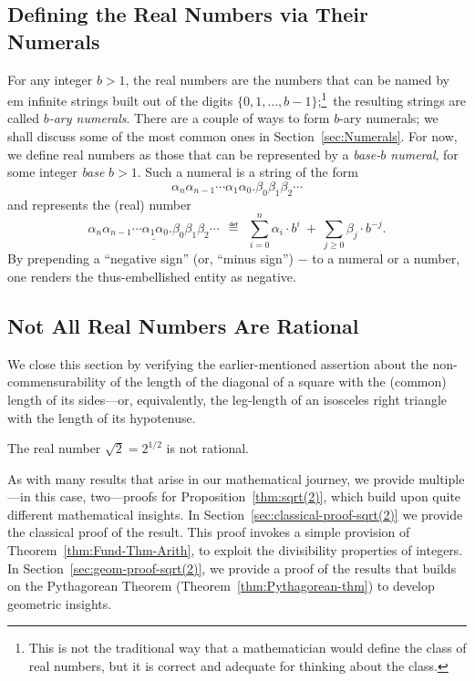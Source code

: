 \subsection{Defining the Real Numbers via Their Numerals}
\label{sec:define-Reals}

For any integer $b > 1$, the real numbers are the numbers that can be
named by {em infinite} strings built out of the digits $\{0, 1,
\ldots, b-1\}$;\footnote{This is not the traditional way that a
  mathematician would define the class of real numbers, but it is
  correct and adequate for thinking about the class.}~the resulting
strings are called {\em $b$-ary numerals}.  There are a couple of ways
to form $b$-ary numerals; we shall discuss some of the most common
ones in Section~\ref{sec:Numerals}.  For now, we define real numbers
as those that can be represented by a {\it base-$b$ numeral},
for some integer {\it base} $b >1$.
Such a numeral is a string of the form
\[
\alpha_n \alpha_{n-1} \cdots \alpha_1 \alpha_0                  
. \beta_0 \beta_1 \beta_2 \cdots
\]
and represents the (real) number
\[
\underline{\alpha_n \alpha_{n-1} \cdots \alpha_1 \alpha_0                  
. \beta_0 \beta_1 \beta_2 \cdots}
\ \ \eqdef \ \
\sum_{i=0}^n \alpha_i \cdot b^i
\ + \ \sum_{j\geq 0} \beta_j \cdot b^{-j}.
\]
By prepending a ``negative sign'' (or, ``minus sign'') $-$ to a
numeral or a number, one renders the thus-embellished entity as
negative.


\subsection{Not All Real Numbers Are Rational}
\label{sec:Real-vs-Rational}

We close this section by verifying the earlier-mentioned assertion
about the non-commensurability of the length of the diagonal of a
square with the (common) length of its sides---or, equivalently, the
leg-length of an isosceles right triangle with the length of its
hypotenuse.


\begin{prop}
\label{thm:sqrt(2)}
The real number $\sqrt{2} = 2^{1/2}$ is not rational.
\end{prop}

As with many results that arise in our mathematical journey, we
provide multiple---in this case, two---proofs for
Proposition~\ref{thm:sqrt(2)}, which build upon quite different
mathematical insights.  In Section~\ref{sec:classical-proof-sqrt(2)}
we provide the classical proof of the result.  This proof invokes a
simple provision of Theorem~\ref{thm:Fund-Thm-Arith}, to exploit the
divisibility properties of integers.  In
Section~\ref{sec:geom-proof-sqrt(2)}, we provide a proof of the
results that builds on the Pythagorean Theorem
(Theorem~\ref{thm:Pythagorean-thm}) to develop geometric insights.

